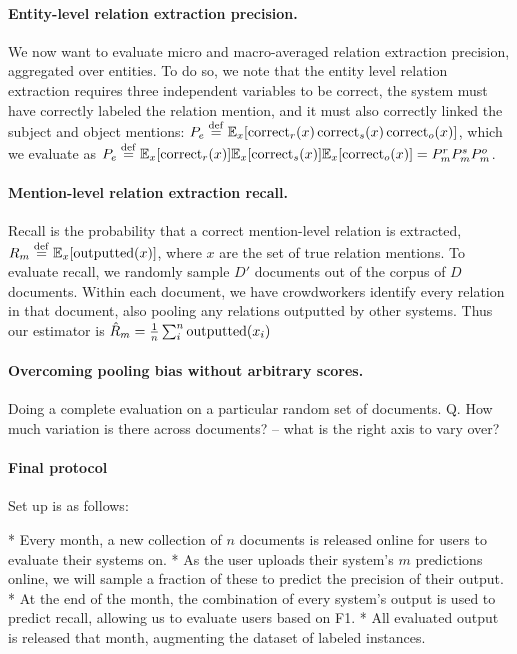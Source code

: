 \paragraph{Entity-level relation extraction precision.}
We now want to evaluate micro and macro-averaged relation extraction precision, aggregated over entities. 
To do so, we note that the entity level relation extraction requires three independent variables to be correct, the system must have correctly labeled the relation mention, and it must also correctly linked the subject and object mentions: $P_e \stackrel{\rm def}{=} \mathbb{E}_{x}[ \operatorname{correct}_r(x) \operatorname{correct}_s(x) \operatorname{correct}_o(x)]$, which we evaluate as $P_e \stackrel{\rm def}{=} \mathbb{E}_{x}[\operatorname{correct}_r(x)] \mathbb{E}_{x}[\operatorname{correct}_s(x)]\mathbb{E}_{x}[ \operatorname{correct}_o(x)] = P^r_m P^s_m P^o_m$.

\paragraph{Mention-level relation extraction recall.}
Recall is the probability that a correct mention-level relation is extracted,
  $R_m \stackrel{\rm def}{=} \mathbb{E}_{x}[\operatorname{outputted}(x)]$, where $x$ are the set of true relation mentions.
To evaluate recall, we randomly sample $D'$ documents out of the corpus of $D$ documents.
Within each document, we have crowdworkers identify every relation in that document, also pooling any relations outputted by other systems. 
Thus our estimator is $\hat{R}_m = \frac{1}{n} \sum_{i}^n \operatorname{outputted}(x_i)$ 

\paragraph{Overcoming pooling bias without arbitrary scores.}

Doing a complete evaluation on a particular random set of documents.
Q. How much variation is there across documents? -- what is the right axis to vary over? 

\paragraph{Final protocol}

Set up is as follows:

* Every month, a new collection of $n$ documents is released online for users to evaluate their systems on.
* As the user uploads their system's $m$ predictions online, we will sample a fraction of these to predict the precision of their output.
* At the end of the month, the combination of every system's output is used to predict recall, allowing us to evaluate users based on F1.
* All evaluated output is released that month, augmenting the dataset of labeled instances.

